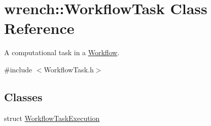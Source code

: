 \hypertarget{classwrench_1_1_workflow_task}{}\section{wrench\+:\+:Workflow\+Task Class Reference}
\label{classwrench_1_1_workflow_task}


A computational task in a \hyperlink{classwrench_1_1_workflow}{Workflow}.  




{\ttfamily \#include $<$Workflow\+Task.\+h$>$}

\subsection*{Classes}
\begin{DoxyCompactItemize}
\item 
struct \hyperlink{structwrench_1_1_workflow_task_1_1_workflow_task_execution}{Workflow\+Task\+Execution}
\end{DoxyCompactItemize}

